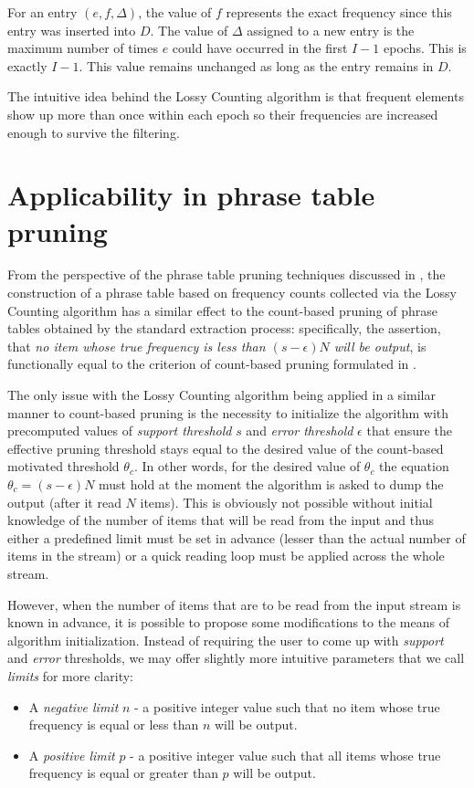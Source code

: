 For an entry $(e, f, \Delta)$, the value of $f$ represents the exact frequency
since this entry was inserted into $D$.
The value of $\Delta$ assigned to a new entry is the maximum number of times
$e$ could have occurred in the first $I-1$ epochs. This is exactly $I-1$.
This value remains unchanged as long as the entry remains in $D$.

The intuitive idea behind the Lossy Counting algorithm is that frequent elements
show up more than once within each epoch so their frequencies are increased enough
to survive the filtering.

\section{Applicability in phrase table pruning}
\label{sec:lossy-counting-applicability}

From the perspective of the phrase table pruning techniques discussed in
, the construction of a phrase table based on frequency counts
collected via the Lossy Counting algorithm has a similar effect to the count-based pruning of
phrase tables obtained by the standard extraction process:
specifically, the assertion, that \emph{no item whose true frequency is less than
$(s - \epsilon)N$ will be output}, is functionally equal to the criterion of
count-based pruning formulated in .

The only issue with the Lossy Counting algorithm being applied in a similar manner to
count-based pruning is the necessity to initialize the algorithm with precomputed values of
\emph{support threshold} $s$ and \emph{error threshold} $\epsilon$ that ensure
the effective pruning threshold stays equal to the desired value of the count-based
motivated threshold $\theta_{c}$.
In other words, for the desired value of $\theta_{c}$ the equation $\theta_{c} = (s - \epsilon)N$
must hold at the moment the algorithm is asked to dump the output (after it read $N$ items).
This is obviously not possible without initial knowledge of the number of items
that will be read from the input and thus either a predefined limit must be set in advance
(lesser than the actual number of items in the stream) or a quick reading loop must be applied
across the whole stream.

However, when the number of items that are to be read from the input stream is known
in advance, it is possible to propose some modifications to the means of algorithm
initialization.
Instead of requiring the user to come up with \emph{support} and \emph{error} thresholds,
we may offer slightly more intuitive parameters that we call \emph{limits} for more clarity:
\begin{itemize}
  \item A \emph{negative limit} $n$ - a positive integer value such that no item
    whose true frequency is equal or less than $n$ will be output.
  \item A \emph{positive limit} $p$ - a positive integer value such that all items
    whose true frequency is equal or greater than $p$ will be output.
\end{itemize}

